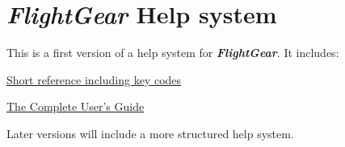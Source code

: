 \documentclass[10pt]{article}
\newcommand{\FlightGear}{{\itshape\bfseries FlightGear}}
\begin{document}
\section*{\FlightGear{} Help system}
\medskip

This is a first version of a help system for \FlightGear{}. It includes:
\medskip

\href{file:FGShortRef.html}{Short reference including key codes}
\medskip

\href{file getstart.html}{The Complete User's Guide}
\medskip

Later versions will include a more structured help system.
\end{document}
